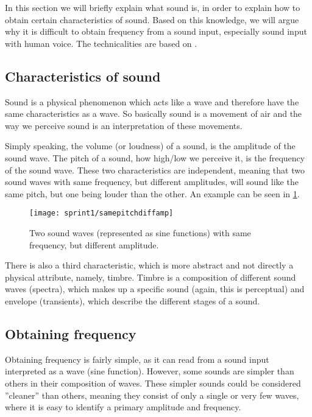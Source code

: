 In this section we will briefly explain what sound is, in order to explain how to obtain certain characteristics of sound.
Based on this knowledge, we will argue why it is difficult to obtain frequency from a sound input, especially sound input with human voice.
The technicalities are based on \cite{music-and-computers}.

\subsection{Characteristics of sound}
Sound is a physical phenomenon which acts like a wave and therefore have the same characteristics as a wave.
So basically sound is a movement of air and the way we perceive sound is an interpretation of these movements.

Simply speaking, the volume (or loudness) of a sound, is the amplitude of the sound wave.
The pitch of a sound, how high/low we perceive it, is the frequency of the sound wave.
These two characteristics are independent, meaning that two sound waves with same frequency, but different amplitudes, will sound like the same pitch, but one being louder than the other.
An example can be seen in \cref{fig:samepitchdiffamp}.

\begin{figure}[h]
\centering
\texttt{[image: sprint1/samepitchdiffamp]}
\caption{Two sound waves (represented as sine functions) with same frequency, but different amplitude.}
\label{fig:samepitchdiffamp}
\end{figure}

There is also a third characteristic, which is more abstract and not directly a physical attribute, namely, timbre.
Timbre is a composition of different sound waves (spectra), which makes up a specific sound (again, this is perceptual) and envelope (transients), which describe the different stages of a sound.

\subsection{Obtaining frequency}
Obtaining frequency is fairly simple, as it can read from a sound input interpreted as a wave (sine function).
However, some sounds are simpler than others in their composition of waves.
These simpler sounds could be considered ''cleaner'' than others, meaning they consist of only a single or very few waves, where it is easy to identify a primary amplitude and frequency.

